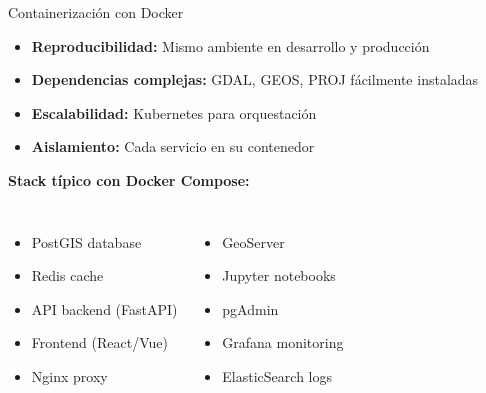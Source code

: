 \documentclass[10pt,aspectratio=169]{beamer}
\newcommand{\conceptbox}[2]{
\begin{tcolorbox}[colframe=usachblue,colback=blue!5,title=#1,fonttitle=\bfseries]
#2
\end{tcolorbox}
}
\begin{document}
\begin{frame}{Containerización con Docker}
    \conceptbox{¿Por qué Docker para Geo?}{
        \begin{itemize}
            \item \textbf{Reproducibilidad:} Mismo ambiente en desarrollo y producción
            \item \textbf{Dependencias complejas:} GDAL, GEOS, PROJ fácilmente instaladas
            \item \textbf{Escalabilidad:} Kubernetes para orquestación
            \item \textbf{Aislamiento:} Cada servicio en su contenedor
        \end{itemize}
    }
    
    \textbf{Stack típico con Docker Compose:}
    \begin{columns}[T]
        \begin{itemize}
            \item PostGIS database
            \item Redis cache
            \item API backend (FastAPI)
            \item Frontend (React/Vue)
            \item Nginx proxy
        \end{itemize}
        
        \begin{itemize}
            \item GeoServer
            \item Jupyter notebooks
            \item pgAdmin
            \item Grafana monitoring
            \item ElasticSearch logs
        \end{itemize}
    \end{columns}
\end{frame}
\end{document}

